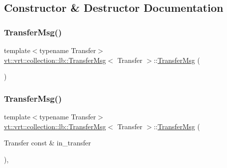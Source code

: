 \subsection{Constructor \& Destructor Documentation}
\mbox{\label{structvt_1_1vrt_1_1collection_1_1lb_1_1_transfer_msg_ad94fef4d81e901de07019aa41718c516}} 
\subsubsection{\texorpdfstring{Transfer\+Msg()}{TransferMsg()}\hspace{0.1cm}{\footnotesize\ttfamily [1/2]}}
{\footnotesize\ttfamily template$<$typename Transfer$>$ \\
\hyperlink{structvt_1_1vrt_1_1collection_1_1lb_1_1_transfer_msg}{vt\+::vrt\+::collection\+::lb\+::\+Transfer\+Msg}$<$ Transfer $>$\+::\hyperlink{structvt_1_1vrt_1_1collection_1_1lb_1_1_transfer_msg}{Transfer\+Msg} (\begin{DoxyParamCaption}{ }\end{DoxyParamCaption})\hspace{0.3cm}{\ttfamily [default]}}

\mbox{\label{structvt_1_1vrt_1_1collection_1_1lb_1_1_transfer_msg_a3f2753a92fc1d0fa93489b9adf102533}} 
\subsubsection{\texorpdfstring{Transfer\+Msg()}{TransferMsg()}\hspace{0.1cm}{\footnotesize\ttfamily [2/2]}}
{\footnotesize\ttfamily template$<$typename Transfer$>$ \\
\hyperlink{structvt_1_1vrt_1_1collection_1_1lb_1_1_transfer_msg}{vt\+::vrt\+::collection\+::lb\+::\+Transfer\+Msg}$<$ Transfer $>$\+::\hyperlink{structvt_1_1vrt_1_1collection_1_1lb_1_1_transfer_msg}{Transfer\+Msg} (\begin{DoxyParamCaption}\item[{Transfer const \&}]{in\+\_\+transfer }\end{DoxyParamCaption})\hspace{0.3cm}{\ttfamily [inline]}, {\ttfamily [explicit]}}



